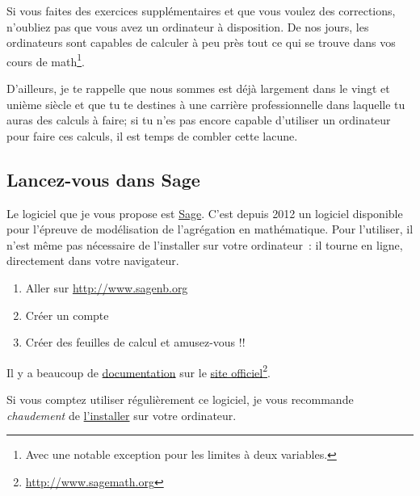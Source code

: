 Si vous faites des exercices supplémentaires et que vous voulez des corrections, n'oubliez pas que vous avez un ordinateur à disposition. De nos jours, les ordinateurs sont capables de calculer à peu près tout ce qui se trouve dans vos cours de math\footnote{Avec une notable exception pour les limites à deux variables.}.

D'ailleurs, je te rappelle que nous sommes est déjà largement dans le vingt et unième siècle et que tu te destines à une carrière professionnelle dans laquelle tu auras des calculs à faire; si tu n'es pas encore capable d'utiliser un ordinateur pour faire ces calculs, il est temps de combler cette lacune.

\subsection{Lancez-vous dans Sage}

Le logiciel que je vous propose est \href{http://www.sagemath.org}{Sage}. C'est depuis 2012 un logiciel disponible pour l'épreuve de modélisation de l'agrégation en mathématique. Pour l'utiliser, il n'est même pas nécessaire de l'installer sur votre ordinateur~: il tourne en ligne, directement dans votre navigateur.

\begin{enumerate}

	\item
		Aller sur \href{http://www.sagenb.org}{http://www.sagenb.org}
	\item
		Créer un compte
	\item
		Créer des feuilles de calcul et amusez-vous !!

\end{enumerate}

Il y a beaucoup de \href{http://lmgtfy.com/?q=sage+documentation}{documentation} sur le \href{http://www.sagemath.org}{site officiel}\footnote{\href{http://www.sagemath.org}{http://www.sagemath.org}}.

Si vous comptez utiliser régulièrement ce logiciel, je vous recommande \emph{chaudement} de \href{http://mirror.switch.ch/mirror/sagemath/index.html}{l'installer} sur votre ordinateur.

